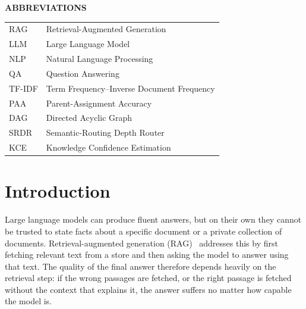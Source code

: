 \documentclass[12pt, a4paper, openright, twoside]{report}
\begin{document}
\renewcommand*{\contentsname}{\MakeUppercase{Contents}}
\renewcommand*{\listfigurename}{\MakeUppercase{List of Figures}}
\renewcommand*{\listtablename}{\MakeUppercase{List of Tables}}
\renewcommand{\bibname}{REFERENCES}
\setcounter{page}{1}
\clearpage
\tableofcontents
\clearpage
{}
\listoffigures
\clearpage
\begingroup
\let\clearpage\relax
\null\null
{}
\listoftables
\endgroup
\cleardoublepage

\begin{center}
\textbf{{\huge ABBREVIATIONS}}
\end{center}
\vspace{1em}
\renewcommand{\arraystretch}{1.5}
\begin{table}[H]
\centering
\begin{tabular}{p{} p{}}
RAG & Retrieval-Augmented Generation \\
LLM & Large Language Model \\
NLP & Natural Language Processing \\
QA  & Question Answering \\
TF-IDF & Term Frequency--Inverse Document Frequency \\
PAA & Parent-Assignment Accuracy \\
DAG & Directed Acyclic Graph \\
SRDR & Semantic-Routing Depth Router \\
KCE & Knowledge Confidence Estimation \\
\end{tabular}
\end{table}
\cleardoublepage

\chapter{Introduction}
\setcounter{page}{1}

Large language models can produce fluent answers, but on their own they cannot be trusted to state facts about a specific document or a private collection of documents. Retrieval-augmented generation (RAG)~\cite{lewis} addresses this by first fetching relevant text from a store and then asking the model to answer using that text. The quality of the final answer therefore depends heavily on the retrieval step: if the wrong passages are fetched, or the right passage is fetched without the context that explains it, the answer suffers no matter how capable the model is.
\end{document}
